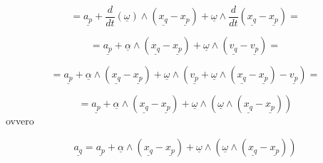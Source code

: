 \[
=
\underline{a_p}
+
\frac{d}{dt}\left(\underline{\omega}\right)\wedge\left(\underline{x_q}-\underline{x_p}\right)
+
\underline{\omega}\wedge\frac{d}{dt}\left(\underline{x_q}-\underline{x_p}\right)
=
\]

\[
=
\underline{a_p}
+
\underline{\alpha}\wedge\left(\underline{x_q}-\underline{x_p}\right)
+
\underline{\omega}\wedge\left(\underline{v_q}-\underline{v_p}\right)
=
\]

\[
=
\underline{a_p}
+
\underline{\alpha}\wedge\left(\underline{x_q}-\underline{x_p}\right)
+
\underline{\omega}\wedge\left(\underline{v_p}+\underline{\omega}\wedge\left(\underline{x_q}-\underline{x_p}\right)-\underline{v_p}\right)
=
\]

\[
=
\underline{a_p}
+
\underline{\alpha}\wedge\left(\underline{x_q}-\underline{x_p}\right)
+
\underline{\omega}\wedge\left(\underline{\omega}\wedge\left(\underline{x_q}-\underline{x_p}\right)\right)
\]
ovvero

\[
\underline{a_q}
=
\underline{a_p}
+
\underline{\alpha}\wedge\left(\underline{x_q}-\underline{x_p}\right)
+
\underline{\omega}\wedge\left(\underline{\omega}\wedge\left(\underline{x_q}-\underline{x_p}\right)\right)
\]
